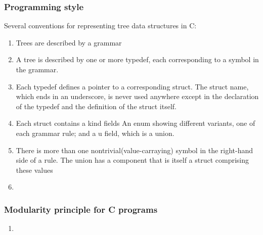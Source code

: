 \subsubsection{Programming style}
Several conventions for representing tree data structures in C:
\begin{enumerate}
    \item Trees are described by a grammar
    \item A tree is described by one or more typedef, each corresponding to a symbol in the grammar.
    \item Each typedef defines a pointer to a corresponding struct.
    \subitem The struct name, which ends in an underscore, is never used anywhere except in the declaration of the typedef and the definition of the struct itself.
    \item Each struct contains a kind fields
    \subitem An enum showing different variants, one of each grammar rule; and a u field, which is a union.
    \item There is more than one nontrivial(value-carraying) symbol in the right-hand side of a rule. The union has a component that is itself a struct comprising these values
    \item %
\end{enumerate}


\subsubsection{Modularity principle for C programs}
\begin{enumerate}
    \item %
\end{enumerate}
